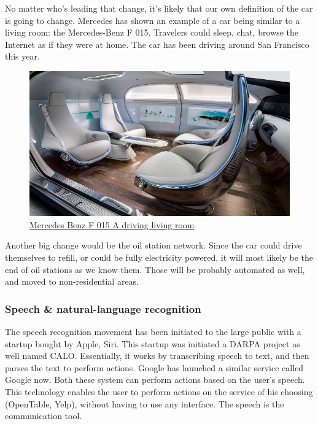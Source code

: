\documentclass[12pt]{article}
\begin{document}
\smallskip

No matter who's leading that change, it's likely that our own definition of the
car is going to change. Mercedes has shown an example of a car being similar to
a living room: the Mercedes-Benz F 015. Travelers could sleep, chat, browse the
Internet as if they were at home. The car has been driving around San Francisco
this year.\\

\smallskip
\begin{figure}[ht]
    \centering
    \includegraphics[width=\linewidth]{mercedes}
    \caption{\href{http://www.entrepreneur.com/article/243751}
    {Mercedes Benz F 015 A driving living room}}
    \label{fig:mercedesBenz}
\end{figure}

\smallskip

Another big change would be the oil station network. Since the car could drive
themselves to refill, or could be fully electricity powered, it will most likely
be the end of oil stations as we know them. Those will be probably automated as
well, and moved to non-residential areas.


\subsubsection{Speech \& natural-language recognition}

The speech recognition movement has been initiated to the large public with a
startup bought by Apple, Siri. This startup was initiated a DARPA project as
well named CALO. Essentially, it works by transcribing speech to text, and then
parses the text to perform actions. Google has launched a similar service called
Google now. Both these system can perform actions based on the user's speech.
This technology enables the user to perform actions on the service of his
choosing (OpenTable, Yelp), without having to use any interface. The speech is
the communication tool.
\end{document}
